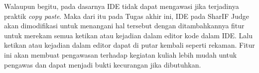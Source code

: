 Walaupun begitu, pada dasarnya IDE tidak dapat mengawasi jika terjadinya praktik \textit{copy paste}. Maka dari itu pada Tugas akhir ini, IDE pada SharIF Judge akan dimodifikasi untuk menangani hal tersebut dengan ditambahkannya fitur untuk merekam semua ketikan atau kejadian dalam editor kode dalam IDE. Lalu ketikan atau kejadian dalam editor dapat di putar kembali seperti rekaman. Fitur ini akan membuat pengawasan terhadap kegiatan kuliah lebih mudah untuk pengawas dan dapat menjadi bukti kecurangan jika dibutuhkan.

\begin{comment}
Ujian merupakan sebuah alat bantu untuk menilai pemahaman pelajar tentang ilmu yang diberikan oleh pengajar. Salah satu ujian yang diberikan kepada pelajar informatika adalah ujian koding yang biasanya dinilai berdasarkan ketepatan algoritma yang dipakai. Tetapi melakukan penilaian untuk setiap kode merupakan sebuah hal yang sulit untuk dilakukan karena dibutuhkannya waktu yang lama. Maka dari itu website \textit{judge} dibuat untuk memudahkan pekerjaan pengajar.

\textit{Judge} merupakan sebuah website yang akan menilai sebuah kode dengan menjalankannya berdasarkan masukkan yang ditentukan dan menyamakan keluaran dari kode dengan keluaran yang sudah ditetapkan oleh pembuat soal dalam kurun waktu yang ditetapkan. Oleh karena itu, kode yang dibuat harus dapat mencakupi waktu yang diberikan dengan mengunakan algoritma yang tepat. Bukan hanya menilai dengan keluaran yang tetap tetapi \textit{judge} juga dapat mengunakan kode yang sudah dibuat oleh pengajar dan membandingkannya dengan keluaran kode yang di kumpulkan.

Sudah banyak perguruan tinggi informatika yang mengunakan website \textit{judge} dalam pemeriksaan kode pelajar termasuk perguruan UNPAR untuk penilai kode dari para mahasiswanya. Judge yang digunakan adalah SharIF-Judge~\cite{sharif} yang dimodifikasi oleh Stillmen Vallian terhadap Sharif-Judge~\cite{stillmen:sharif} buatan Mohammad Javad Naderi dengan \textit{framework} CodeIgniter dan Bash. Gambar~\ref{fig:1:dashboardpng} merupakan halaman utama setelah masuk ke dalam website SharIF-Judge.

\begin{figure}[H]
    \centering
    \texttt{[image: dashboard]}
    \caption[Tampilan Awal SharIF Judge]{Tampilan Awal SharIF Judge}
    \label{fig:1:dashboardpng}
\end{figure}


\end{comment}
